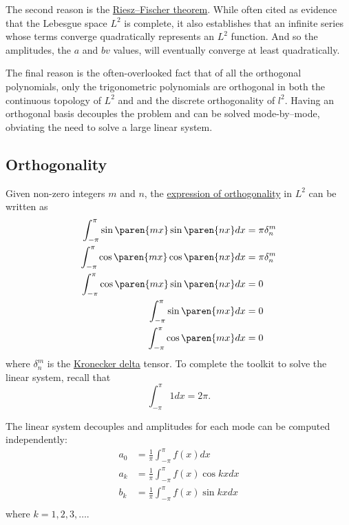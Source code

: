 The second reason is the \href{https://en.wikipedia.org/wiki/Riesz–Fischer_theorem}{Riesz–Fischer theorem}. While often cited as evidence that the Lebesgue space $L^{2}$ is complete, it also establishes that an infinite series whose terms converge quadratically represents an $L^{2}$ function. And so the amplitudes, the $a$ and $bv$ values, will eventually converge at least quadratically.

The final reason is the often-overlooked fact that of all the orthogonal polynomials, only the trigonometric polynomials are orthogonal in both the continuous topology of $L^{2}$ and and the discrete orthogonality of $l^{2}$. Having an orthogonal basis decouples the problem and can be solved mode-by--mode, obviating the need to solve a large linear system.

\subsection{Orthogonality}
Given non-zero integers $m$ and $n$, the \href{https://mathworld.wolfram.com/FourierSeries.html}{expression of orthogonality} in $L^{2}$ can be written as
\begin{equation}
	\begin{split}
		\int_{-\pi}^{\pi} \sin \paren{mx} \sin \paren{nx}dx &= \pi \delta^{m}_{n}\\
		\int_{-\pi}^{\pi} \cos \paren{mx} \cos \paren{nx} dx &= \pi \delta^{m}_{n}\\
		\int_{-\pi}^{\pi} \cos \paren{mx} \sin \paren{nx} dx &= 0\\
		\int_{-\pi}^{\pi} \sin \paren{mx} dx &= 0\\
		\int_{-\pi}^{\pi} \cos \paren{mx}dx &= 0\\
	\end{split}
\label{eq:orthogonality}
\end{equation}
%
where $\delta^{m}_{n}$ is the \href{https://mathworld.wolfram.com/KroneckerDelta.html}{Kronecker delta} tensor. To complete the toolkit to solve the linear system, recall that
\begin{equation}
	\int_{-\pi}^{\pi} 1 dx = 2\pi.
\end{equation}

The linear system decouples and amplitudes for each mode can be computed independently:
\begin{equation}
	\begin{split}
		a_{0} &= \tfrac{1}{\pi} \int_{-\pi}^{\pi} f(x) dx \\
		a_{k} &= \tfrac{1}{\pi} \int_{-\pi}^{\pi} f(x) \cos kx dx \\
		b_{k} &= \tfrac{1}{\pi} \int_{-\pi}^{\pi} f(x) \sin kx dx \\
	\end{split}
\end{equation}
where $k=1,2,3,\dots$.

